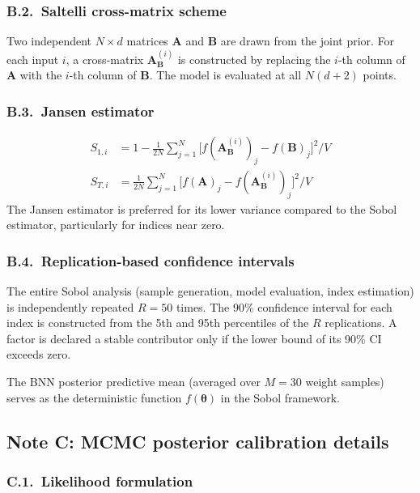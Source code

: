 \documentclass[11pt,a4paper]{article}
\begin{document}
\subsubsection*{B.2.~Saltelli cross-matrix scheme}

Two independent $N \times d$ matrices $\mathbf{A}$ and $\mathbf{B}$ are
drawn from the joint prior. For each input $i$, a cross-matrix
$\mathbf{A}_\mathbf{B}^{(i)}$ is constructed by replacing the $i$-th
column of $\mathbf{A}$ with the $i$-th column of $\mathbf{B}$. The model
is evaluated at all $N(d+2)$ points.

\subsubsection*{B.3.~Jansen estimator}

\begin{align}
S_{1,i} &= 1 - \frac{1}{2N}\sum_{j=1}^{N}
  \bigl[f(\mathbf{A}_\mathbf{B}^{(i)})_j - f(\mathbf{B})_j\bigr]^2 / V \\
S_{T,i} &= \frac{1}{2N}\sum_{j=1}^{N}
  \bigl[f(\mathbf{A})_j - f(\mathbf{A}_\mathbf{B}^{(i)})_j\bigr]^2 / V
\end{align}
The Jansen estimator is preferred for its lower variance compared to
the Sobol estimator, particularly for indices near zero.

\subsubsection*{B.4.~Replication-based confidence intervals}

The entire Sobol analysis (sample generation, model evaluation, index
estimation) is independently repeated $R = 50$ times. The 90\%
confidence interval for each index is constructed from the 5th and 95th
percentiles of the $R$ replications. A factor is declared a stable
contributor only if the lower bound of its 90\% CI exceeds zero.

The BNN posterior predictive mean (averaged over $M = 30$ weight
samples) serves as the deterministic function $f(\boldsymbol{\theta})$
in the Sobol framework.


\subsection{Note C: MCMC posterior calibration details}

\subsubsection*{C.1.~Likelihood formulation}
\end{document}
